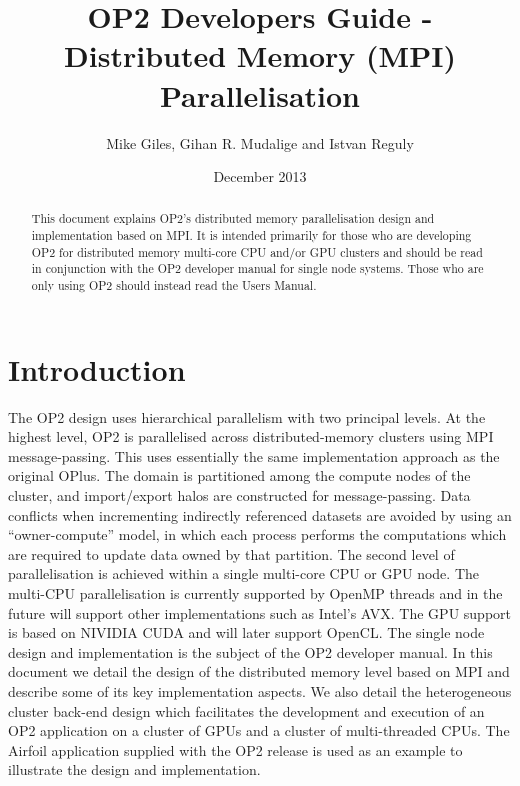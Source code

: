 \documentclass[11pt]{article}
\date{December 2013}
\begin{document}
\title{OP2 Developers Guide - Distributed Memory (MPI) Parallelisation}
\author{Mike Giles, Gihan R. Mudalige and Istvan Reguly}

\maketitle


\begin{abstract}
\noindent This document explains OP2's distributed memory parallelisation design and implementation based on MPI.  It is
intended primarily for those who are developing OP2 for distributed memory multi-core CPU and/or GPU clusters and
should be read in conjunction with the OP2 developer manual for single node systems. Those who are only using OP2 should
instead read the Users Manual.
\end{abstract}

\newpage




\tableofcontents

\newpage

\section{Introduction}
The OP2 design uses hierarchical parallelism with two principal levels. At the highest level, OP2 is parallelised across
distributed-memory clusters using MPI message-passing.  This uses essentially the same implementation approach as the
original OPlus\cite{oplus}. The domain is partitioned among the compute nodes of the cluster, and import/export halos
are constructed for message-passing. Data conflicts when  incrementing indirectly referenced datasets are avoided by
using an ``owner-compute'' model, in which each process performs the computations which are required to update data
owned by that partition. The second level of parallelisation is achieved within a single multi-core CPU or
GPU node. The multi-CPU parallelisation is currently supported by OpenMP threads and in the future will support other
implementations such as Intel's AVX. The GPU support is based on NIVIDIA CUDA and will later support OpenCL. The single
node design and implementation is the subject of the OP2 developer manual. In this document we detail the design of the
distributed memory level based on MPI and describe some of its key implementation aspects. We also detail the
heterogeneous cluster back-end design which facilitates the development and execution of an OP2 application on a cluster
of GPUs and a cluster of multi-threaded CPUs. The Airfoil application supplied with the OP2 release is used as an
example to illustrate the design and implementation.
\end{document}

